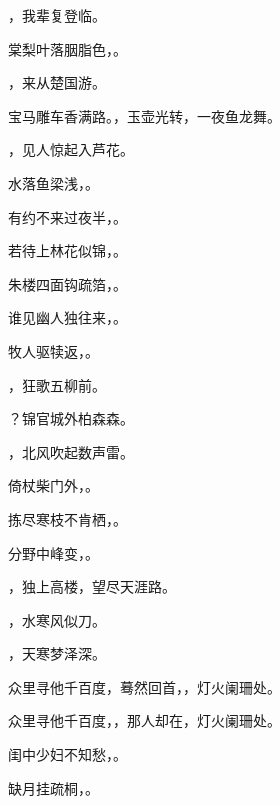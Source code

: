 \documentclass[12pt, a4paper, addpoints]{exam}
\begin{document}
\begin{questions}
\question[2] \uline{\qquad\qquad\qquad\qquad}，我辈复登临。

\question[2] 棠梨叶落胭脂色，\uline{\qquad\qquad\qquad\qquad}。

\question[2] \uline{\qquad\qquad\qquad\qquad}，来从楚国游。

\question[2] 宝马雕车香满路。\uline{\qquad\qquad\qquad\qquad}，玉壶光转，一夜鱼龙舞。

\question[2] \uline{\qquad\qquad\qquad\qquad}，见人惊起入芦花。

\question[2] 水落鱼梁浅，\uline{\qquad\qquad\qquad\qquad}。

\question[2] 有约不来过夜半，\uline{\qquad\qquad\qquad\qquad}。

\question[2] 若待上林花似锦，\uline{\qquad\qquad\qquad\qquad}。

\question[2] 朱楼四面钩疏箔，\uline{\qquad\qquad\qquad\qquad}。

\question[2] 谁见幽人独往来，\uline{\qquad\qquad\qquad\qquad}。

\question[2] 牧人驱犊返，\uline{\qquad\qquad\qquad\qquad}。

\question[2] \uline{\qquad\qquad\qquad\qquad}，狂歌五柳前。

\question[2] \uline{\qquad\qquad\qquad\qquad}？锦官城外柏森森。

\question[2] \uline{\qquad\qquad\qquad\qquad}，北风吹起数声雷。

\question[2] 倚杖柴门外，\uline{\qquad\qquad\qquad\qquad}。

\question[2] 拣尽寒枝不肯栖，\uline{\qquad\qquad\qquad\qquad}。

\question[2] 分野中峰变，\uline{\qquad\qquad\qquad\qquad}。

\question[2] \uline{\qquad\qquad\qquad\qquad}，独上高楼，望尽天涯路。

\question[2] \uline{\qquad\qquad\qquad\qquad}，水寒风似刀。

\question[2] \uline{\qquad\qquad\qquad\qquad}，天寒梦泽深。

\question[2] 众里寻他千百度，蓦然回首，\uline{\qquad\qquad\qquad\qquad}，灯火阑珊处。

\question[2] 众里寻他千百度，\uline{\qquad\qquad\qquad\qquad}，那人却在，灯火阑珊处。

\question[2] 闺中少妇不知愁，\uline{\qquad\qquad\qquad\qquad}。

\question[2] 缺月挂疏桐，\uline{\qquad\qquad\qquad\qquad}。


\end{questions}
\end{document}
